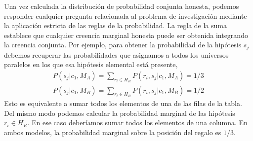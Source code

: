 \documentclass[a4paper,11pt]{book}
\theoremstyle{definition}
\begin{document}
Una vez calculada la distribución de probabilidad conjunta honesta, podemos responder cualquier pregunta relacionada al problema de investigación mediante la aplicación estricta de las reglas de la probabilidad.
%
La regla de la suma establece que cualquier creencia marginal honesta puede ser obtenida integrando la creencia conjunta.
%
Por ejemplo, para obtener la probabilidad de la hipótesis $s_j$ debemos recuperar las probabilidades que asignamos a todos los universos paralelos en los que esa hipótesis elemental está presente,
%
\begin{equation} \label{eq:creencia_marginal}
\begin{split}
P(s_j|c_1,M_A) = \sum_{r_i \in H_R} P(r_i, s_j|c_1, M_A) = 1/3 \\
P(s_j|c_1,M_B) = \sum_{r_i \in H_R} P(r_i, s_j|c_1, M_B) = 1/2
\end{split}
\end{equation}
%
Esto es equivalente a sumar todos los elementos de una de las filas de la tabla.
%
Del mismo modo podemos calcular la probabilidad marginal de las hipótesis $r_i \in H_R$.
%
En ese caso deber\'iamos sumar todos los elementos de una columna.
%
En ambos modelos, la probabilidad marginal sobre la posición del regalo es $1/3$.

\end{document}
